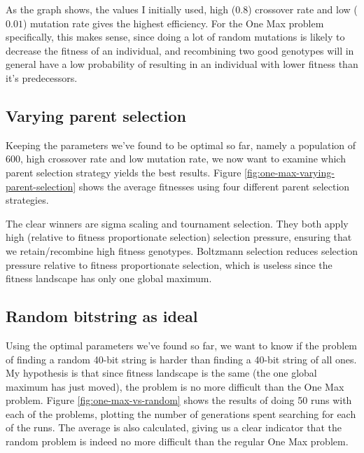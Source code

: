 \documentclass[twoside]{article}
\begin{document}
\begin{multicols}{2}
    As the graph shows, the values I initially used, high ($0.8$) crossover rate and low ($0.01$) mutation rate gives the highest efficiency.
    For the One Max problem specifically, this makes sense, since doing a lot of random mutations is likely to decrease the fitness of an individual, and recombining two good genotypes will in general have a low probability of resulting in an individual with lower fitness than it's predecessors.
    

    \subsection{Varying parent selection}

    Keeping the parameters we've found to be optimal so far, namely a population of 600, high crossover rate and low mutation rate, we now want to examine which parent selection strategy yields the best results.
    Figure \ref{fig:one-max-varying-parent-selection} shows the average fitnesses using four different parent selection strategies.
    
    The clear winners are sigma scaling and tournament selection.
    They both apply high (relative to fitness proportionate selection) selection pressure, ensuring that we retain/recombine high fitness genotypes.
    Boltzmann selection reduces selection pressure relative to fitness proportionate selection, which is useless since the fitness landscape has only one global maximum.


    \subsection{Random bitstring as ideal}

    Using the optimal parameters we've found so far, we want to know if the problem of finding a random 40-bit string is harder than finding a 40-bit string of all ones.
    My hypothesis is that since fitness landscape is the same (the one global maximum has just moved), the problem is no more difficult than the One Max problem.
    Figure \ref{fig:one-max-vs-random} shows the results of doing 50 runs with each of the problems, plotting the number of generations spent searching for each of the runs.
    The average is also calculated, giving us a clear indicator that the random problem is indeed no more difficult than the regular One Max problem.
    


\end{multicols}
\end{document}
